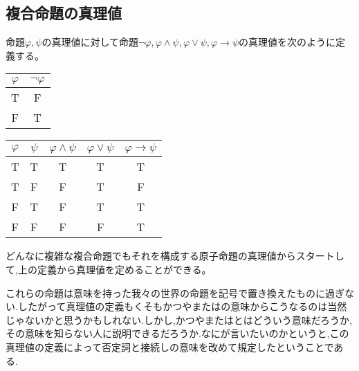 \documentclass[10pt,b5paper,papersize,dvipdfmx]{jsbook}
\begin{document}
\subsection{複合命題の真理値}
命題$\varphi,\psi$の真理値に対して命題$\lnot\varphi,\varphi\land\psi,\varphi\lor\psi,\varphi\to\psi$の真理値を次のように定義する。\\
\begin{table}[H]
\begin{minipage}[t]{.45\textwidth}
\begin{center}
\begin{tabular}{|c||c|}\hline
$\varphi$&$\lnot\varphi$ \\ \hline \hline
T&F \\ \hline
F&T \\ \hline
\end{tabular}
\end{center}
\end{minipage}
\hfill
\begin{minipage}[t]{.45\textwidth}
\begin{center}
\begin{tabular}{|c|c||c|c|c|}\hline
$\varphi$&$\psi$&$\varphi\land\psi$&$\varphi\lor\psi$&$\varphi\to\psi$ \\ \hline \hline
T&T&T&T&T \\ \hline
T&F&F&T&F \\ \hline
F&T&F&T&T \\ \hline
F&F&F&F&T \\ \hline
\end{tabular}
\end{center}
\end{minipage}
\end{table}
どんなに複雑な複合命題でもそれを構成する原子命題の真理値からスタートして,上の定義から真理値を定めることができる。\par
これらの命題は意味を持った我々の世界の命題を記号で置き換えたものに過ぎない.したがって真理値の定義もくそもかつやまたはの意味からこうなるのは当然じゃないかと思うかもしれない.しかし,かつやまたはとはどういう意味だろうか,その意味を知らない人に説明できるだろうか.なにが言いたいのかというと,この真理値の定義によって否定詞と接続しの意味を改めて規定したということである.
\end{document}
